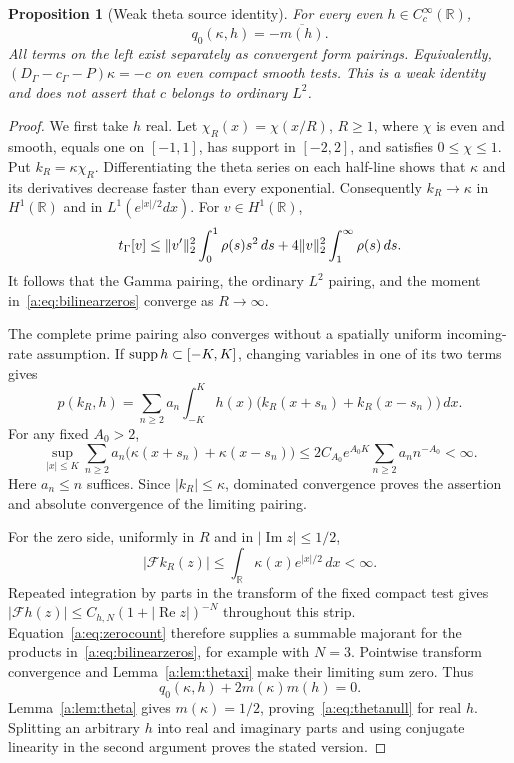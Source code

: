 \documentclass[11pt,a4paper]{article}
\numberwithin{equation}{section}
\newtheorem{proposition}[theorem]{Proposition}
\theoremstyle{definition}\newtheorem{definition}[theorem]{Definition}
\theoremstyle{remark}\newtheorem{remark}[theorem]{Remark}
\newcommand{\R}{\mathbb R}\newcommand{\C}{\mathbb C}\newcommand{\N}{\mathbb N}
\newcommand{\tg}{t_\Gamma}\newcommand{\cg}{c_\Gamma}
\begin{document}
\begin{proposition}[Weak theta source identity]\label{a:prop:thetanull}
For every even $h\in C_c^\infty(\R)$,
\begin{equation}\label{a:eq:thetanull}
 q_0(\kappa,h)=-\overline{m(h)}.
\end{equation}
All terms on the left exist separately as convergent form pairings. Equivalently, $(D_\Gamma-\cg-P)\kappa=-c$ on even compact smooth tests. This is a weak identity and does not assert that $c$ belongs to ordinary $L^2$.
\end{proposition}
\begin{proof}
We first take $h$ real. Let $\chi_R(x)=\chi(x/R)$, $R\ge1$, where $\chi$ is even and smooth, equals one on $[-1,1]$, has support in $[-2,2]$, and satisfies $0\le\chi\le1$. Put $k_R=\kappa\chi_R$. Differentiating the theta series on each half-line shows that $\kappa$ and its derivatives decrease faster than every exponential. Consequently $k_R\to\kappa$ in $H^1(\R)$ and in $L^1(e^{|x|/2}dx)$. For $v\in H^1(\R)$,
\[
 \tg[v]\le\norm{v'}_2^2\int_0^1\rho(s)s^2\,ds
              +4\norm{v}_2^2\int_1^\infty\rho(s)\,ds.
\]
It follows that the Gamma pairing, the ordinary $L^2$ pairing, and the moment in~\eqref{a:eq:bilinearzeros} converge as $R\to\infty$.

The complete prime pairing also converges without a spatially uniform incoming-rate assumption. If $\operatorname{supp} h\subset[-K,K]$, changing variables in one of its two terms gives
\[
 p(k_R,h)=\sum_{n\ge2}a_n\int_{-K}^K h(x)
           \bigl(k_R(x+s_n)+k_R(x-s_n)\bigr)\,dx.
\]
For any fixed $A_0>2$,
\begin{equation}\label{a:eq:bridgeprimerate}
 \sup_{|x|\le K}\sum_{n\ge2}a_n
       \bigl(\kappa(x+s_n)+\kappa(x-s_n)\bigr)
 \le2C_{A_0}e^{A_0K}\sum_{n\ge2}a_nn^{-A_0}<\infty.
\end{equation}
Here $a_n\le n$ suffices. Since $|k_R|\le\kappa$, dominated convergence proves the assertion and absolute convergence of the limiting pairing.

For the zero side, uniformly in $R$ and in $|\operatorname{Im}z|\le1/2$,
\[
 |\mathcal Fk_R(z)|\le\int_\R\kappa(x)e^{|x|/2}\,dx<\infty.
\]
Repeated integration by parts in the transform of the fixed compact test gives
$|\mathcal Fh(z)|\le C_{h,N}(1+|\operatorname{Re}z|)^{-N}$ throughout this strip. Equation~\eqref{a:eq:zerocount} therefore supplies a summable majorant for the products in~\eqref{a:eq:bilinearzeros}, for example with $N=3$. Pointwise transform convergence and Lemma~\ref{a:lem:thetaxi} make their limiting sum zero. Thus
\[
 q_0(\kappa,h)+2m(\kappa)m(h)=0.
\]
Lemma~\ref{a:lem:theta} gives $m(\kappa)=1/2$, proving~\eqref{a:eq:thetanull} for real $h$. Splitting an arbitrary $h$ into real and imaginary parts and using conjugate linearity in the second argument proves the stated version.
\end{proof}
\end{document}
